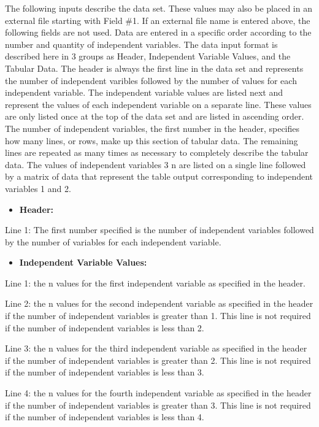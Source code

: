 The following inputs describe the data set. These values may also be placed in an external file starting with Field \#1. If an external file name is entered above, the following fields are not used. Data are entered in a specific order according to the number and quantity of independent variables. The data input format is described here in 3 groups as Header, Independent Variable Values, and the Tabular Data. The header is always the first line in the data set and represents the number of independent varibles followed by the number of values for each independent variable. The independent variable values are listed next and represent the values of each independent variable on a separate line. These values are only listed once at the top of the data set and are listed in ascending order. The number of independent variables, the first number in the header, specifies how many lines, or rows, make up this section of tabular data. The remaining lines are repeated as many times as necessary to completely describe the tabular data. The values of independent variables 3 n are listed on a single line followed by a matrix of data that represent the table output corresponding to independent variables 1 and 2.

\begin{itemize}
\tightlist
\item
  \textbf{Header:}
\end{itemize}

Line 1: The first number specified is the number of independent variables followed by the number of variables for each independent variable.

\begin{itemize}
\tightlist
\item
  \textbf{Independent Variable Values:}
\end{itemize}

Line 1: the n values for the first independent variable as specified in the header.

Line 2: the n values for the second independent variable as specified in the header if the number of independent variables is greater than 1. This line is not required if the number of independent variables is less than 2.

Line 3: the n values for the third independent variable as specified in the header if the number of independent variables is greater than 2. This line is not required if the number of independent variables is less than 3.

Line 4: the n values for the fourth independent variable as specified in the header if the number of independent variables is greater than 3. This line is not required if the number of independent variables is less than 4.


